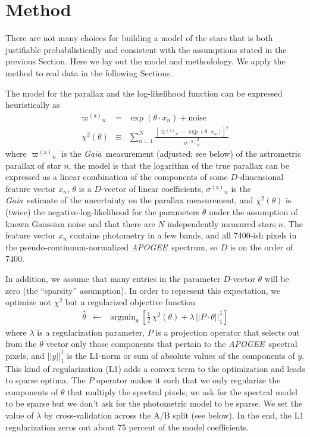 \documentclass[modern]{aastex62}
\newcommand{\sectionname}{Section}
\newcommand{\acronym}[1]{{\small{#1}}}
\newcommand{\project}[1]{\textsl{#1}}
\newcommand{\apogee}{\project{\acronym{APOGEE}}}
\newcommand{\gaia}{\project{Gaia}}
\DeclareMathOperator*{\argmin}{argmin}
\newcommand{\gparallax}{{\varpi^{(\mathrm{a})}}}
\newcommand{\gsigma}{{\sigma^{(\mathrm{a})}}}
\begin{document}
\section{Method}\label{sec:method}

There are not many choices
for building a model of the stars that is both justifiable probabilistically
and consistent with the assumptions stated in the previous \sectionname.
Here we lay out the model and methodology.
We apply the method to real data in the following {\sectionname s}.

The model for the parallax
and the log-likelihood function can be expressed heuristically as
\begin{eqnarray}
\gparallax_n &=& \exp(\theta\cdot x_n) + \mbox{noise}
\\
\chi^2(\theta) &\equiv& \sum_{n=1}^N \frac{[\gparallax_n - \exp(\theta\cdot x_n)]^2}{\gsigma_n^2}
\end{eqnarray}
where
$\gparallax_n$ is the \gaia\ measurement (adjusted; see below) of the astrometric parallax of star $n$,
the model is that the logarithm of the true parallax
can be expressed as a linear combination of the components
of some $D$-dimensional feature vector $x_n$,
$\theta$ is a $D$-vector of linear coefficients,
$\gsigma_n$ is the \gaia\ estimate of the uncertainty on the parallax measurement,
and $\chi^2(\theta)$ is (twice) the negative-log-likelihood for the parameters $\theta$
under the assumption of known Gaussian noise and
that there are $N$ independently measured stars $n$.
The feature vector $x_n$ contains photometry in a few bands, and all 7400-ish pixels
in the pseudo-continuum-normalized \apogee\ spectrum, so $D$ is on the order of 7400.

In addition, we assume that many entries in the parameter $D$-vector $\theta$ will be zero
(the ``sparsity'' assumption).
In order to represent this expectation,
we optimize not $\chi^2$ but a regularized objective function
\begin{eqnarray}
\hat{\theta} &\leftarrow& \argmin_{\theta}\left[\frac{1}{2}\,\chi^2(\theta) + \lambda\,||P\cdot\theta||_1^1\right]
\label{eq:objective}
\end{eqnarray}
where
$\lambda$ is a regularization parameter,
$P$ is a projection operator that selects out from the $\theta$ vector only those components
that pertain to the \apogee\ spectral pixels,
and $||y||_1^1$ is the L1-norm or sum of absolute values of the components of $y$.
This kind of regularization (L1) adds a convex term to the optimization and leads to
sparse optima.
The $P$ operator makes it such that we only regularize the components of $\theta$ that multiply
the spectral pixels; we ask for the spectral model to be sparse but we don't ask for the photometric
model to be sparse.
We set the value of $\lambda$ by cross-validation across the A/B split (see below).
In the end, the L1 regularization zeros out about 75 percent of the model coefficients.
\end{document}
